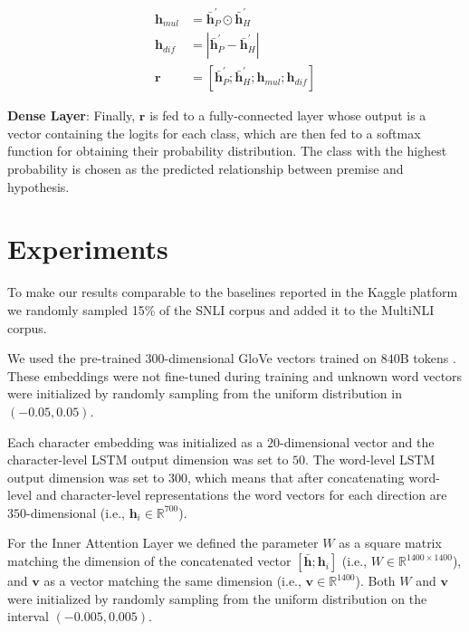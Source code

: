\documentclass[11pt,letterpaper]{article}
\begin{document}
\begin{align}
	\bm{h}_{mul} &= \bar{\bm{h}}_P^{\prime} \odot \bar{\bm{h}}_H^{\prime}\\
    \bm{h}_{dif} &= | \bar{\bm{h}}_P^{\prime} - \bar{\bm{h}}_H^{\prime} | \\
    \bm{r}       &= [\bar{\bm{h}}_P^{\prime} ; \bar{\bm{h}}_H^{\prime} ; \bm{h}_{mul} ; \bm{h}_{dif}]
\end{align}



\textbf{Dense Layer}: Finally, $\bm{r}$ is fed to a fully-connected layer whose output is a vector containing the logits for each class, which are then fed to a softmax function for obtaining their probability distribution. The class with the highest probability is chosen as the predicted relationship between premise and hypothesis.

\section{Experiments}

To make our results comparable to the baselines reported in the Kaggle platform we randomly sampled 15\% of the SNLI corpus \cite{bowman2015snli} and added it to the MultiNLI corpus.

We used the pre-trained $300$-dimensional GloVe vectors trained on $840$B tokens \cite{pennington2014glove}. These embeddings were not fine-tuned during training and unknown word vectors were initialized by randomly sampling from the uniform distribution in $(-0.05, 0.05)$.

Each character embedding was initialized as a $20$-dimensional vector and the character-level LSTM output dimension was set to $50$. The word-level LSTM output dimension was set to $300$, which means that after concatenating word-level and character-level representations the word vectors for each direction are $350$-dimensional (i.e., $\bm{h}_i \in \mathbb{R}^{700}$).

For the Inner Attention Layer we defined the parameter $W$ as a square matrix matching the dimension of the concatenated vector $[\bar{\bm{h}}; \bm{h}_i]$ (i.e., $W \in \mathbb{R}^{1400\times 1400}$), and $\bm{v}$ as a vector matching the same dimension (i.e., $\bm{v} \in \mathbb{R}^{1400}$).  Both $W$ and $\bm{v}$ were initialized by randomly sampling from the uniform distribution on the interval $(-0.005, 0.005)$.
\end{document}
